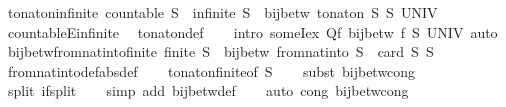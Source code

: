\begin{isabellebody}
\endisatagproof
{\isafoldproof}%
%
\isadelimproof
\isanewline
%
\endisadelimproof
\isanewline
{}\isamarkupfalse%
\ to{\isacharunderscore}nat{\isacharunderscore}on{\isacharunderscore}infinite{\isacharcolon}\ {\isachardoublequoteopen}countable\ S\ {\isasymLongrightarrow}\ infinite\ S\ {\isasymLongrightarrow}\ bij{\isacharunderscore}betw\ {\isacharparenleft}to{\isacharunderscore}nat{\isacharunderscore}on\ S{\isacharparenright}\ S\ UNIV{\isachardoublequoteclose}\isanewline
%
\isadelimproof
\ \ %
\endisadelimproof
%
\isatagproof
{}\isamarkupfalse%
\ countableE{\isacharunderscore}infinite\ \isamarkupfalse%
\ to{\isacharunderscore}nat{\isacharunderscore}on{\isacharunderscore}def\isanewline
\ \ \isamarkupfalse%
\ {\isacharparenleft}intro\ someI{}{\isacharunderscore}ex{\isacharbrackleft}\ Q{\isacharequal}{\isachardoublequoteopen}{\isasymlambda}f{\isachardot}\ bij{\isacharunderscore}betw\ f\ S\ UNIV{\isachardoublequoteclose}{\isacharbrackright}{\isacharparenright}\ auto%
\endisatagproof
{\isafoldproof}%
%
\isadelimproof
\isanewline
%
\endisadelimproof
\isanewline
{}\isamarkupfalse%
\ bij{\isacharunderscore}betw{\isacharunderscore}from{\isacharunderscore}nat{\isacharunderscore}into{\isacharunderscore}finite{\isacharcolon}\ {\isachardoublequoteopen}finite\ S\ {\isasymLongrightarrow}\ bij{\isacharunderscore}betw\ {\isacharparenleft}from{\isacharunderscore}nat{\isacharunderscore}into\ S{\isacharparenright}\ {\isacharbraceleft}{\isachardot}{\isachardot}{\isacharless}\ card\ S{\isacharbraceright}\ S{\isachardoublequoteclose}\isanewline
%
\isadelimproof
\ \ %
\endisadelimproof
%
\isatagproof
{}\isamarkupfalse%
\ from{\isacharunderscore}nat{\isacharunderscore}into{\isacharunderscore}def{\isacharbrackleft}abs{\isacharunderscore}def{\isacharbrackright}\isanewline
\ \ \isamarkupfalse%
\ to{\isacharunderscore}nat{\isacharunderscore}on{\isacharunderscore}finite{\isacharbrackleft}of\ S{\isacharbrackright}\isanewline
\ \ \isamarkupfalse%
\ {\isacharparenleft}subst\ bij{\isacharunderscore}betw{\isacharunderscore}cong{\isacharparenright}\isanewline
\ \ \isamarkupfalse%
\ {\isacharparenleft}split\ if{\isacharunderscore}split{\isacharparenright}\isanewline
\ \ \isamarkupfalse%
\ {\isacharparenleft}simp\ add{\isacharcolon}\ bij{\isacharunderscore}betw{\isacharunderscore}def{\isacharparenright}\isanewline
\ \ \isamarkupfalse%
\ {\isacharparenleft}auto\ cong{\isacharcolon}\ bij{\isacharunderscore}betw{\isacharunderscore}cong\isanewline

\end{isabellebody}
